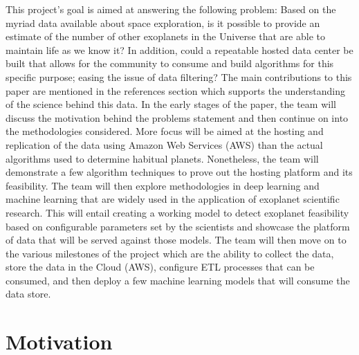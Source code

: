 \documentclass[letterpaper, 10 pt, conference]{ieeeconf}  %
\begin{document}
This project's goal is aimed at answering the following problem: Based on the myriad data available about space exploration, is it possible to provide an estimate of the number of other exoplanets in the Universe that are able to maintain life as we know it? In addition, could a repeatable hosted data center be built that allows for the community to consume and build algorithms for this specific purpose; easing the issue of data filtering? The main contributions to this paper are mentioned  in the references section which supports the understanding of the science behind this data. In the early stages of the paper, the team will discuss the motivation behind the problems statement and then continue on into the methodologies considered. More focus will be aimed at the hosting and replication of the data using Amazon Web Services (AWS) than the actual algorithms used to determine habitual planets. Nonetheless, the team will demonstrate a few algorithm techniques to prove out the hosting platform and its feasibility. The team will then explore methodologies in deep learning and machine learning that are widely used in the application of exoplanet scientific research. This will entail creating a working model to detect exoplanet feasibility based on configurable parameters set by the scientists and showcase the platform of data that will be served against those models. The team will then move on to the various milestones of the project which are the ability to collect the data, store the data in the Cloud (AWS), configure ETL processes that can be consumed, and then deploy a few machine learning models that will consume the data store.

\section{Motivation}
\end{document}
